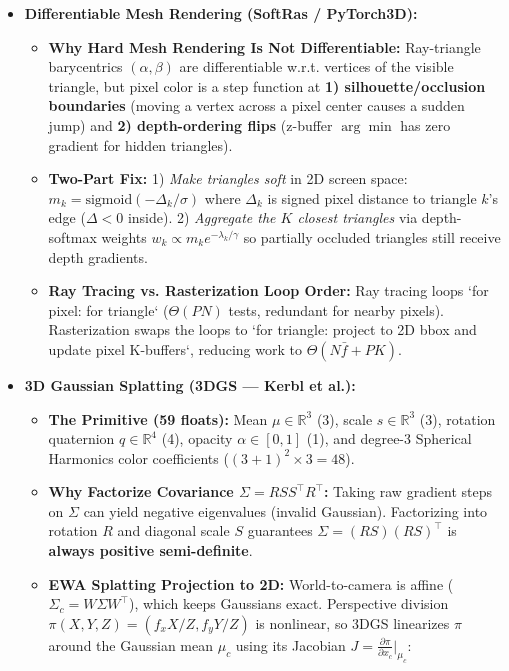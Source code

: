 \documentclass[10pt, a4paper]{article}
\begin{document}
\begin{itemize}
    \item \textbf{Differentiable Mesh Rendering (SoftRas / PyTorch3D):}
    \begin{itemize}
        \item \textbf{Why Hard Mesh Rendering Is Not Differentiable:} Ray-triangle barycentrics $(\alpha, \beta)$ are differentiable w.r.t. vertices of the visible triangle, but pixel color is a step function at \textbf{1) silhouette/occlusion boundaries} (moving a vertex across a pixel center causes a sudden jump) and \textbf{2) depth-ordering flips} (z-buffer $\arg\min$ has zero gradient for hidden triangles).
        \item \textbf{Two-Part Fix:}
        1) \emph{Make triangles soft} in 2D screen space: $m_k = \text{sigmoid}(-\Delta_k / \sigma)$ where $\Delta_k$ is signed pixel distance to triangle $k$'s edge ($\Delta < 0$ inside).
        2) \emph{Aggregate the $K$ closest triangles} via depth-softmax weights $w_k \propto m_k e^{-\lambda_k / \gamma}$ so partially occluded triangles still receive depth gradients.
        \item \textbf{Ray Tracing vs. Rasterization Loop Order:} Ray tracing loops `for pixel: for triangle` ($\Theta(PN)$ tests, redundant for nearby pixels). Rasterization swaps the loops to `for triangle: project to 2D bbox and update pixel K-buffers`, reducing work to $\Theta(N\bar{f} + PK)$.
    \end{itemize}
    \item \textbf{3D Gaussian Splatting (3DGS --- Kerbl et al.):}
    \begin{itemize}
        \item \textbf{The Primitive (59 floats):} Mean $\mu \in \mathbb{R}^3$ (3), scale $s \in \mathbb{R}^3$ (3), rotation quaternion $q \in \mathbb{R}^4$ (4), opacity $\alpha \in [0,1]$ (1), and degree-3 Spherical Harmonics color coefficients ($(3+1)^2 \times 3 = 48$).
        \item \textbf{Why Factorize Covariance $\Sigma = R S S^\top R^\top$:} Taking raw gradient steps on $\Sigma$ can yield negative eigenvalues (invalid Gaussian). Factorizing into rotation $R$ and diagonal scale $S$ guarantees $\Sigma = (RS)(RS)^\top$ is \textbf{always positive semi-definite}.
        \item \textbf{EWA Splatting Projection to 2D:} World-to-camera is affine ($\Sigma_c = W\Sigma W^\top$), which keeps Gaussians exact. Perspective division $\pi(X,Y,Z) = (f_x X/Z, f_y Y/Z)$ is nonlinear, so 3DGS linearizes $\pi$ around the Gaussian mean $\mu_c$ using its Jacobian $J = \frac{\partial \pi}{\partial x_c}\big|_{\mu_c}$:

\end{itemize}
\end{itemize}
\end{document}
